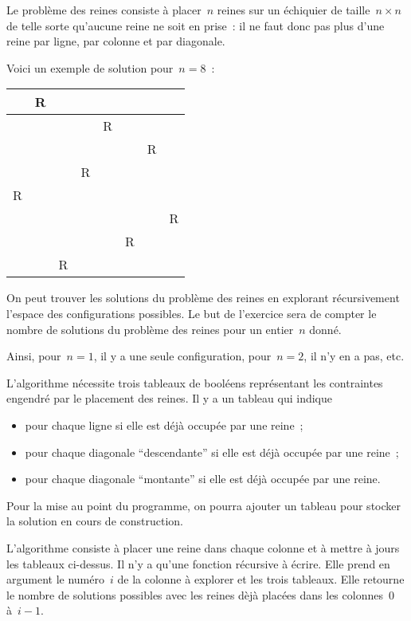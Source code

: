 \begin{exercice}
  Le probl\`eme  des reines consiste    \`a placer~$n$ reines  sur  un
  \'echiquier de taille~${n\times n}$  de telle sorte  qu'aucune reine
  ne soit en prise~: il ne faut  donc pas plus  d'une reine par ligne,
  par colonne et par diagonale.
  \par
  Voici un exemple de solution pour~${n=8}$~:
  \par
  \begin{tabular}{|c|c|c|c|c|c|c|c|}
    \hline
    &R& & & & & & \\
    \hline
    & & & &R& & & \\
    \hline
    & & & & & &R& \\
    \hline
    & & &R& & & & \\
    \hline
    R& & & & & & & \\
    \hline
    & & & & & & &R\\
    \hline
    & & & & &R& & \\
    \hline
    & &R& & & & & \\
    \hline
  \end{tabular}
  On peut trouver les solutions du probl\`eme  des reines en explorant
  r\'ecursivement  l'espace des  configurations  possibles. Le  but de
  l'exercice sera de compter le  nombre de solutions du probl\`eme des
  reines pour un entier~$n$ donn\'e.
  \par
  Ainsi, pour~${n=1}$, il  y a une seule  configuration, pour~${n=2}$,
  il n'y en a pas, etc.
  \par
  L'algorithme n\'ecessite trois tableaux de bool\'eens repr\'esentant
  les contraintes engendr\'e par le placement des reines. Il y a un tableau qui indique
  \begin{itemize}
  \item pour chaque ligne si elle est d\'ej\`a occup\'ee par une reine~;
  \item pour chaque diagonale ``descendante'' si elle est d\'ej\`a occup\'ee par une reine~;
  \item pour chaque diagonale ``montante'' si elle est d\'ej\`a occup\'ee par une reine.
  \end{itemize}
  Pour la  mise au point  du programme, on  pourra ajouter  un tableau
  pour stocker la solution en cours de construction.
  \par
  L'algorithme consiste  \`a placer une reine  dans  chaque colonne et
  \`a mettre  \`a  jours  les tableaux  ci-dessus.   Il  n'y  a qu'une
  fonction r\'ecursive    \`a \'ecrire.  Elle  prend  en   argument le
  num\'ero~$i$ de la colonne \`a explorer  et les trois tableaux. Elle
  retourne le nombre  de solutions possibles  avec les reines d\`ej\`a
  plac\'ees dans les colonnes~$0$ \`a~${i-1}$.
\end{exercice}
